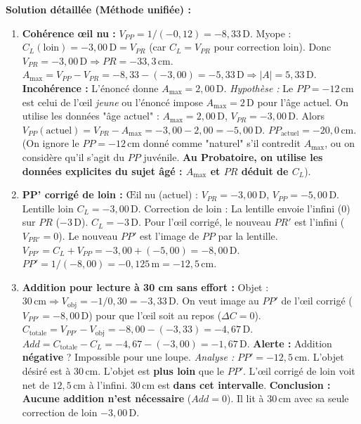 \documentclass[11pt]{article}
\begin{document}
\begin{exoresolu}
\tcblower
\textbf{Solution détaillée (Méthode unifiée) :}
\begin{enumerate}
    \item \textbf{Cohérence œil nu :}
    $V_{PP} = 1/(-0,12) = -8,33\,\text{D}$.
    Myope : $C_L(\text{loin}) = -3,00\,\text{D} = V_{PR}$ (car $C_L = V_{PR}$ pour correction loin).
    Donc $V_{PR} = -3,00\,\text{D} \Rightarrow PR = -33,3\,\text{cm}$.
    $A_{\text{max}} = V_{PP} - V_{PR} = -8,33 - (-3,00) = -5,33\,\text{D} \Rightarrow |A| = 5,33\,\text{D}$.
    \textbf{Incohérence :} L'énoncé donne $A_{\text{max}} = 2,00\,\text{D}$.
    \textit{Hypothèse :} Le $PP = -12\,\text{cm}$ est celui de l'œil \emph{jeune} ou l'énoncé impose $A_{\text{max}}=2\,\text{D}$ pour l'âge actuel. On utilise les données "âge actuel" : $A_{\text{max}} = 2,00\,\text{D}$, $V_{PR} = -3,00\,\text{D}$.
    Alors $V_{PP}(\text{actuel}) = V_{PR} - A_{\text{max}} = -3,00 - 2,00 = -5,00\,\text{D}$.
    $PP_{\text{actuel}} = -20,0\,\text{cm}$.
    (On ignore le $PP=-12\,\text{cm}$ donné comme "naturel" s'il contredit $A_{\text{max}}$, ou on considère qu'il s'agit du $PP$ juvénile. \textbf{Au Probatoire, on utilise les données explicites du sujet âgé : $A_{\text{max}}$ et $PR$ déduit de $C_L$}).
    \item \textbf{PP' corrigé de loin :} Œil nu (actuel) : $V_{PR} = -3,00\,\text{D}$, $V_{PP} = -5,00\,\text{D}$.
    Lentille loin $C_L = -3,00\,\text{D}$.
    Correction de loin : La lentille envoie l'infini ($0$) sur $PR$ ($-3\,\text{D}$). $C_L = -3\,\text{D}$.
    Pour l'œil corrigé, le nouveau $PR'$ est l'infini ($V_{PR'}=0$).
    Le nouveau $PP'$ est l'image de $PP$ par la lentille.
    $V_{PP'} = C_L + V_{PP} = -3,00 + (-5,00) = -8,00\,\text{D}$.
    $PP' = 1/(-8,00) = -0,125\,\text{m} = -12,5\,\text{cm}$.
    \item \textbf{Addition pour lecture à 30 cm sans effort :}
    Objet : $30\,\text{cm} \Rightarrow V_{\text{obj}} = -1/0,30 = -3,33\,\text{D}$.
    On veut image au $PP'$ de l'œil corrigé ($V_{PP'} = -8,00\,\text{D}$) pour que l'œil soit au repos ($\Delta C = 0$).
    $C_{\text{totale}} = V_{PP'} - V_{\text{obj}} = -8,00 - (-3,33) = -4,67\,\text{D}$.
    $Add = C_{\text{totale}} - C_L = -4,67 - (-3,00) = -1,67\,\text{D}$.
    \textbf{Alerte :} Addition \textbf{négative} ? Impossible pour une loupe.
    \textit{Analyse :} $PP' = -12,5\,\text{cm}$. L'objet désiré est à $30\,\text{cm}$. L'objet est \textbf{plus loin} que le $PP'$.
    L'œil corrigé de loin voit net de $12,5\,\text{cm}$ à l'infini. $30\,\text{cm}$ est \textbf{dans cet intervalle}.
    \textbf{Conclusion :} \textbf{Aucune addition n'est nécessaire} ($Add = 0$). Il lit à $30\,\text{cm}$ avec sa seule correction de loin $-3,00\,\text{D}$.

\end{enumerate}
\end{exoresolu}
\end{document}
